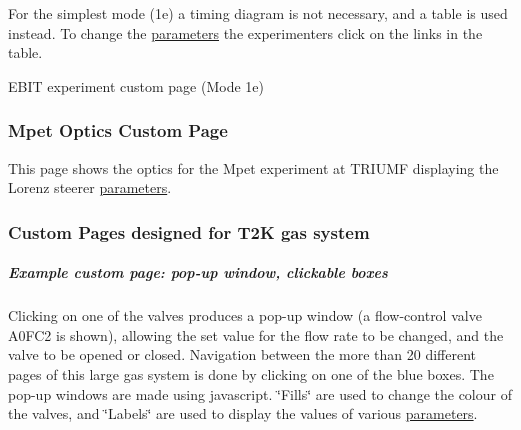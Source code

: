For the simplest mode (1e) a timing diagram is not necessary, and a table is used instead. To change the \hyperlink{structparameters}{parameters} the experimenters click on the links in the table. \par
\par
 \begin{center} EBIT experiment custom page (Mode 1e)\par
\par
  \end{center} 

\par
\par




\par
 \label{index_end}
\hypertarget{index_end}{}
 \subsubsection{Mpet Optics Custom Page}\label{RC_Mpet_custom_page}
\par




\par


This page shows the optics for the Mpet experiment at TRIUMF displaying the Lorenz steerer \hyperlink{structparameters}{parameters}.

\begin{center}  \end{center} 

\par




\par
 \label{index_end}
\hypertarget{index_end}{}
 \subsubsection{Custom Pages designed for T2K gas system}\label{RC_T2K_Gas_Page}
\par




\par
\hypertarget{RC_T2K_Gas_Page_T2K_example_1}{}\subparagraph{Example custom page: pop-\/up window, clickable boxes}\label{RC_T2K_Gas_Page_T2K_example_1}
Clicking on one of the valves produces a pop-\/up window (a flow-\/control valve A0FC2 is shown), allowing the set value for the flow rate to be changed, and the valve to be opened or closed. Navigation between the more than 20 different pages of this large gas system is done by clicking on one of the blue boxes. The pop-\/up windows are made using javascript. \char`\"{}Fills\char`\"{} are used to change the colour of the valves, and \char`\"{}Labels\char`\"{} are used to display the values of various \hyperlink{structparameters}{parameters}.

